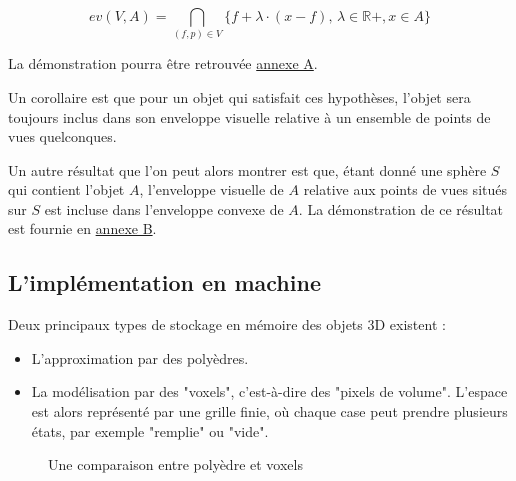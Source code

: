 \documentclass[a4paper]{article}
\begin{document}
      \[
      ev(V, A) = \bigcap_{(f, p) \in V} \{f + \lambda \cdot (x - f), \, \lambda \in \mathbb{R}+, x \in A\}
      \]

      La démonstration pourra être retrouvée \hyperref[AnnexeA]{annexe A}.

      Un corollaire est que pour un objet qui satisfait ces hypothèses, l'objet sera toujours inclus dans son enveloppe visuelle relative à un ensemble de points de vues quelconques.

      Un autre résultat que l'on peut alors montrer est que, étant donné une sphère $S$ qui contient l'objet $A$, l'enveloppe visuelle de $A$ relative aux points de vues situés sur $S$ est  incluse dans l'enveloppe convexe de $A$. La démonstration de ce résultat est fournie en \hyperref[AnnexeB]{annexe B}.

    \subsection{L'implémentation en machine}
      Deux principaux types de stockage en mémoire des objets 3D existent :
      \begin{itemize}
        \item L'approximation par des polyèdres.
        \item La modélisation par des "voxels", c'est-à-dire des "pixels de volume". L'espace est alors représenté par une grille finie, où chaque case peut prendre plusieurs états, par exemple "remplie" ou "vide".
      \end{itemize}
      \begin{figure}[h]%
          \centering
          \qquad
          \caption{Une comparaison entre polyèdre et voxels}%
          \label{fig1}%
      \end{figure}
\end{document}
